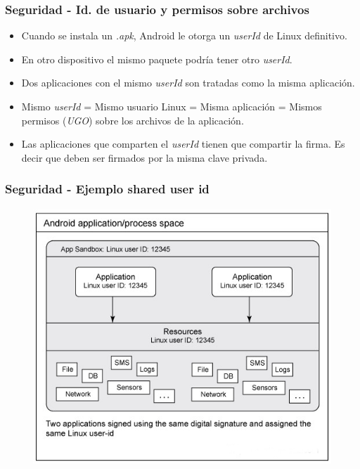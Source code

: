 \begin{frame}
  \frametitle{Seguridad - Id. de usuario y permisos sobre archivos}
  \begin{itemize}
    \item Cuando se instala un \textit{.apk}, Android le otorga un \textit{userId} de Linux definitivo.
    
    \item En otro dispositivo el mismo paquete podría tener otro \textit{userId}.
    
    \item Dos aplicaciones con el mismo \textit{userId} son tratadas como la misma aplicación.
    
    \item Mismo \textit{userId} = Mismo usuario Linux = Misma aplicación = Mismos permisos (\textit{UGO}) sobre los archivos de la aplicación.
    
    \item Las aplicaciones que comparten el \textit{userId} tienen que compartir la firma. Es decir que deben ser firmados por la misma clave privada.        
  \end{itemize}
\end{frame}

\begin{frame}
  \frametitle{Seguridad - Ejemplo shared user id}
  \begin{figure}
    \centering
    \includegraphics[scale=0.4]{images/two-same-apps.jpg}
  \end{figure}
\end{frame}

